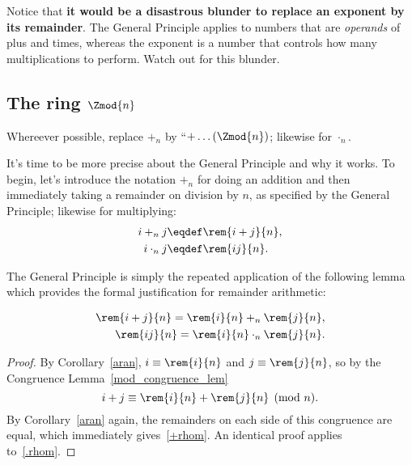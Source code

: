 Notice that \textbf{it would be a disastrous blunder to replace an
  exponent by its remainder}.  The General Principle applies to
numbers that are \emph{operands} of plus and times, whereas the
exponent is a number that controls how many multiplications to
perform.  Watch out for this blunder.

\subsection{The ring $\Zmod{n}$}\label{subsec:ringZn}

\begin{editingnotes}
Whereever possible, replace $+_n$ by ``$+ \dots (\Zmod{n})$; likewise
for $\cdot_n$.
\end{editingnotes}

It's time to be more precise about the General Principle and why it
works.  To begin, let's introduce the notation $+_n$ for doing an
addition and then immediately taking a remainder on division by $n$,
as specified by the General Principle; likewise for multiplying:
\begin{align*}
i +_n j & \eqdef \rem{i+j}{n},\\
i \cdot_n j & \eqdef \rem{ij}{n}.
\end{align*}

The General Principle is simply the repeated application of the
following lemma which provides the formal justification for remainder
arithmetic:
\begin{lemma}\label{rem-morphism}
\begin{align}
\rem{i+j}{n} = \rem{i}{n} +_n \rem{j}{n},\label{+rhom}\\
\rem{ij}{n} = \rem{i}{n} \cdot_n \rem{j}{n}.\label{.rhom}
\end{align}
\end{lemma}

\begin{proof}
By Corollary~\ref{aran}, $i \equiv \rem{i}{n}$ and $j \equiv
\rem{j}{n}$, so by the Congruence Lemma~\ref{mod_congruence_lem}
\[
i + j \equiv \rem{i}{n} + \rem{j}{n} \pmod{n}.
\]
By Corollary~\ref{aran} again, the remainders on each side of this
congruence are equal, which immediately gives~\eqref{+rhom}.  An
identical proof applies to~\eqref{.rhom}.
\end{proof}

